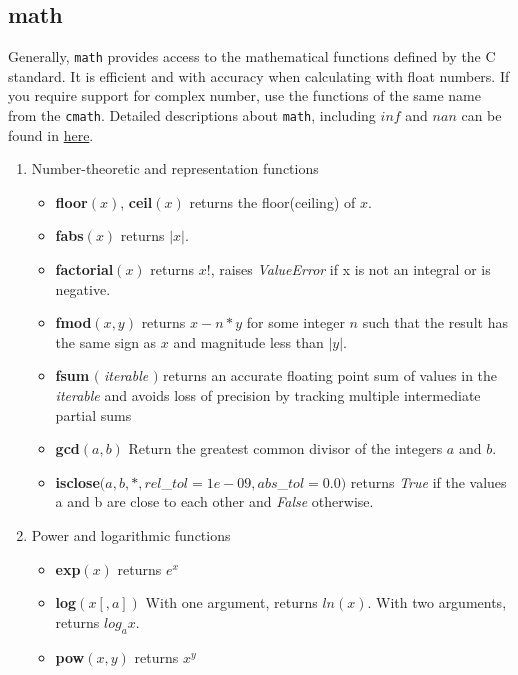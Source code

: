 \subsection{math}
Generally, \texttt{math} provides access to the mathematical functions defined by the C standard. It is efficient and with accuracy when calculating with float numbers. If you require support for complex number, use the functions of the same name from the \texttt{cmath}. Detailed descriptions about \texttt{math}, including $inf$ and $nan$ can be found in \href{https://pymotw.com/3/math/index.html#module-math}{here}.
\begin{enumerate}
\item Number-theoretic and representation functions
\begin{itemize}
\item \textbf{floor}$(x)$, \textbf{ceil}$(x)$ returns the floor(ceiling) of $x$.
\item \textbf{fabs}$(x)$ returns $|x|$.
\item \textbf{factorial}$(x)$ returns $x!$, raises \textit{ValueError} if x is not an integral or is negative.
\item \textbf{fmod}$(x,y)$ returns  $x - n*y$ for some integer $n$ such that the result has the same sign as $x$ and magnitude less than $|y|$.
\item \textbf{fsum} $($ \textit{iterable} $)$ returns an accurate floating point sum of values in the \textit{iterable} and avoids loss of precision by tracking multiple intermediate partial sums
\item \textbf{gcd}$(a,b)$ Return the greatest common divisor of the integers $a$ and $b$.
\item \textbf{isclose}$(a,b,*,rel$\_$tol=1e-09, abs$\_$tol=0.0)$ returns \textit{True} if the values a and b are close to each other and \textit{False} otherwise.
\end{itemize}

\item Power and logarithmic functions
\begin{itemize}
\item \textbf{exp}$(x)$ returns $e^x$
\item \textbf{log}$(x[, a])$ With one argument, returns $ln(x)$. With two arguments, returns $log_ax$.
\item \textbf{pow}$(x,y)$ returns $x^y$
\end{itemize}


\end{enumerate}
